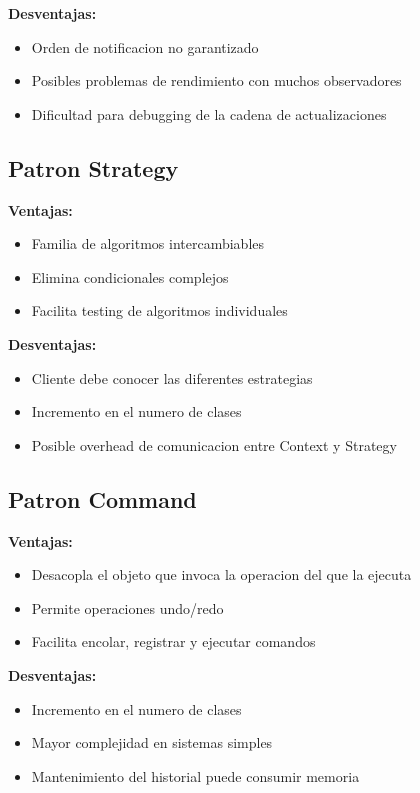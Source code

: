 \documentclass[11pt,a4paper]{article}
\begin{document}
\textbf{Desventajas:}
\begin{itemize}
    \item Orden de notificacion no garantizado
    \item Posibles problemas de rendimiento con muchos observadores
    \item Dificultad para debugging de la cadena de actualizaciones
\end{itemize}

\subsection{Patron Strategy}

\textbf{Ventajas:}
\begin{itemize}
    \item Familia de algoritmos intercambiables
    \item Elimina condicionales complejos
    \item Facilita testing de algoritmos individuales
\end{itemize}

\textbf{Desventajas:}
\begin{itemize}
    \item Cliente debe conocer las diferentes estrategias
    \item Incremento en el numero de clases
    \item Posible overhead de comunicacion entre Context y Strategy
\end{itemize}

\subsection{Patron Command}

\textbf{Ventajas:}
\begin{itemize}
    \item Desacopla el objeto que invoca la operacion del que la ejecuta
    \item Permite operaciones undo/redo
    \item Facilita encolar, registrar y ejecutar comandos
\end{itemize}

\textbf{Desventajas:}
\begin{itemize}
    \item Incremento en el numero de clases
    \item Mayor complejidad en sistemas simples
    \item Mantenimiento del historial puede consumir memoria
\end{itemize}
\end{document}
